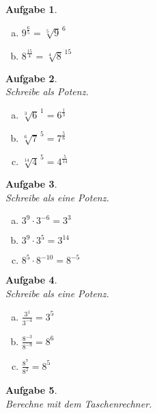 \documentclass[12pt,fleqn]{article}
\theoremstyle{aufg}
\newtheorem{aufgabe}{Aufgabe}
\theoremstyle{bsp}
\begin{document}
\begin{flushleft}
\begin{aufgabe}
\begin{multicols}{3}
\begin{enumerate}[a)]
$5^{\frac{11}{8}}=$$\sqrt[8]{5}^{\,11}$
\item 
$9^{\frac{6}{5}}=$$\sqrt[5]{9}^{\,6}$
\item 
$8^{\frac{15}{4}}=$$\sqrt[4]{8}^{\,15}$
\end{enumerate} 
\end{multicols} 
\end{aufgabe} 
\begin{aufgabe} ~ \\ 
Schreibe als Potenz. \\ 
\begin{multicols}{3} 
\begin{enumerate}[a)] 
\item 
$\sqrt[3]{6}^{\,1}=$$6^{\frac{1}{3}}$
\item 
$\sqrt[6]{7}^{\,5}=$$7^{\frac{5}{6}}$
\item 
$\sqrt[14]{4}^{\,5}=$$4^{\frac{5}{14}}$
\end{enumerate} 
\end{multicols} 
\end{aufgabe} 
\begin{aufgabe} ~ \\ 
Schreibe als eine Potenz. \\ 
\begin{multicols}{3} 
\begin{enumerate}[a)] 
\item 
$3^{9}\cdot3^{-6}=$$3^{3}$
\item 
$3^{9}\cdot3^{5}=$$3^{14}$
\item 
$8^{5}\cdot8^{-10}=$$8^{-5}$
\end{enumerate} 
\end{multicols} 
\end{aufgabe} 
\begin{aufgabe} ~ \\ 
Schreibe als eine Potenz. \\ 
\begin{multicols}{3} 
\begin{enumerate}[a)] 
\item 
$\frac{3^{1}}{3^{-4}}=$$3^{5}$
\item 
$\frac{8^{-3}}{8^{-9}}=$$8^{6}$
\item 
$\frac{8^{7}}{8^{2}}=$$8^{5}$
\end{enumerate} 
\end{multicols} 
\end{aufgabe} 
\begin{aufgabe} ~ \\ 
Berechne mit dem Taschenrechner. \\ 

\end{aufgabe}
\end{flushleft}
\end{document}
